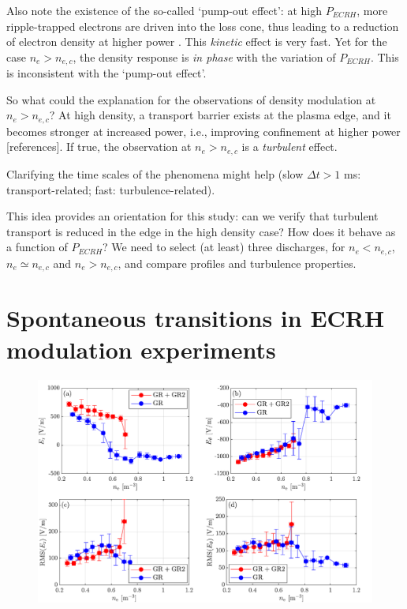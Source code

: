 \documentclass[preprint,12pt,authoryear]{elsarticle}
\begin{document}
Also note the existence of the so-called `pump-out effect': at high $P_{ECRH}$, more ripple-trapped electrons are driven into the loss cone, thus leading to a reduction of electron density at higher power \cite{Castejon:2008}. This {\em kinetic} effect is very fast.
Yet for the case $n_e > n_{e,c}$, the density response is {\em in phase} with the variation of $P_{ECRH}$.
This is inconsistent with the `pump-out effect'.

So what could the explanation for the observations of density modulation at $n_e > n_{e,c}$?
At high density, a transport barrier exists at the plasma edge, and it becomes stronger at increased power, i.e., improving confinement at higher power [references]. If true, the observation at $n_e > n_{e,c}$  is a {\em turbulent} effect. 

Clarifying the time scales of the phenomena might help (slow $\Delta t > 1$ ms: transport-related; fast: turbulence-related).

This idea provides an orientation for this study: can we verify that turbulent transport is reduced in the edge in the high density case? How does it behave as a function of $P_{ECRH}$? We need to select (at least) three discharges, for $n_e < n_{e,c}$, $n_e \simeq n_{e,c}$ and $n_e > n_{e,c}$, and compare profiles and turbulence properties.


\section{Spontaneous transitions in ECRH modulation experiments}

\begin{figure}[!ht]

   \includegraphics[width=1.0\columnwidth]{Images/transition_1.pdf}
   \caption{}
   \label{Fig:transition_1}
\end{figure}
\end{document}
